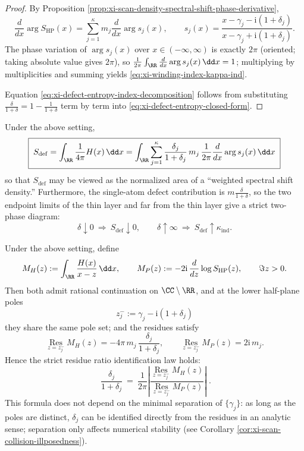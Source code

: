 \begin{proof}
By Proposition \ref{prop:xi-scan-density-spectral-shift-phase-derivative},
\[
\frac{d}{dx}\arg S_{\mathrm{HP}}(x)
=\sum_{j=1}^{\kappa}m_j\frac{d}{dx}\arg s_j(x),
\qquad
s_j(x)=\frac{x-\gamma_j-\mathrm{i}(1+\delta_j)}{x-\gamma_j+\mathrm{i}(1+\delta_j)}.
\]
The phase variation of \(\arg s_j(x)\) over \(x\in(-\infty,\infty)\) is exactly \(2\pi\) (oriented; taking absolute value gives \(2\pi\)), so
\(
\frac{1}{2\pi}\int_{\RR}\frac{d}{dx}\arg s_j(x)\,\dd x=1
\);
multiplying by multiplicities and summing yields \eqref{eq:xi-winding-index-kappa-ind}.
\par
Equation \eqref{eq:xi-defect-entropy-index-decomposition} follows from substituting
\(
\frac{\delta}{1+\delta}=1-\frac{1}{1+\delta}
\)
term by term into \eqref{eq:xi-defect-entropy-closed-form}. \qedhere
\end{proof}

\begin{corollary}\label{cor:xi-defect-entropy-area-law-phase-diagram}
Under the above setting,
\[
\boxed{\;
S_{\mathrm{def}}
=\int_{\RR}\frac{1}{4\pi}H(x)\,\dd x
=\int_{\RR}\sum_{j=1}^{\kappa}\frac{\delta_j}{1+\delta_j}\,m_j\,
\frac{1}{2\pi}\frac{d}{dx}\arg s_j(x)\,\dd x\;}
\]
so that \(S_{\mathrm{def}}\) may be viewed as the normalized area of a ``weighted spectral shift density.''
Furthermore, the single-atom defect contribution is \(m\frac{\delta}{1+\delta}\), so the two endpoint limits of the thin layer and far from the thin layer give a strict two-phase diagram:
\[
\boxed{\;
\delta\downarrow 0\ \Longrightarrow\ S_{\mathrm{def}}\downarrow 0,\qquad
\delta\uparrow\infty\ \Longrightarrow\ S_{\mathrm{def}}\uparrow \kappa_{\mathrm{ind}}.\;}
\]
\end{corollary}



\begin{theorem}\label{thm:xi-double-herglotz-residue-ratio}
Under the above setting, define
\[
M_H(z):=\int_{\RR}\frac{H(x)}{x-z}\,\dd x,
\qquad
M_P(z):=-2\mathrm{i}\,\frac{d}{dz}\log S_{\mathrm{HP}}(z),
\qquad \Im z>0.
\]
Then both admit rational continuation on \(\CC\setminus\RR\), and at the lower half-plane poles
\[
z_j^-:=\gamma_j-\mathrm{i}(1+\delta_j)
\]
they share the same pole set; and the residues satisfy
\[
\operatorname*{Res}_{z=z_j^-} M_H(z)= -4\pi\,m_j\,\frac{\delta_j}{1+\delta_j},
\qquad
\operatorname*{Res}_{z=z_j^-} M_P(z)= 2\mathrm{i}\,m_j.
\]
Hence the strict residue ratio identification law holds:
\[
\boxed{\;
\frac{\delta_j}{1+\delta_j}
\ =\
\frac{1}{2\pi}\left|\frac{\operatorname*{Res}_{z=z_j^-} M_H(z)}{\operatorname*{Res}_{z=z_j^-} M_P(z)}\right|\; }.
\]
This formula does not depend on the minimal separation of \(\{\gamma_j\}\): as long as the poles are distinct, \(\delta_j\) can be identified directly from the residues in an analytic sense;
separation only affects numerical stability (see Corollary \ref{cor:xi-scan-collision-illposedness}).
\end{theorem}

